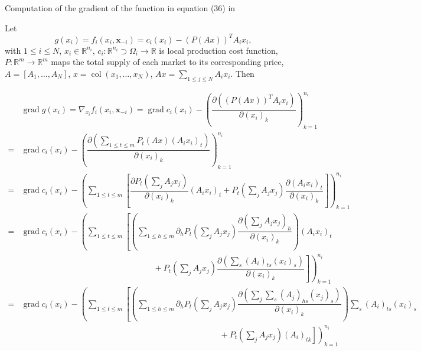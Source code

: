 
Computation of the gradient of the function in equation (36) in \citep{Yi_2019}

Let
$$g(x_i) = f_i(x_i, \mathbf{x}_{-i}) = c_i(x_i) - (P(Ax))^T A_ix_i,$$
with $1 \leqslant i \leqslant N$, $x_i \in \mathbb{R}^{n_i}$, $c_i: \mathbb{R}^{n_i} \supset \Omega_i \to \mathbb{R}$ is local production cost function, $P: \mathbb{R}^m \to \mathbb{R}^m$ maps the total supply of each market to its corresponding price, $A = [A_1, \ldots, A_N]$, $x = \operatorname{col}(x_1, \ldots, x_N)$, $Ax = \sum\limits_{1 \leqslant j \leqslant N} A_ix_i$. Then

\begingroup
\allowdisplaybreaks
\begin{align*}
& \operatorname{grad} g(x_i) = \nabla_{x_i} f_i(x_i, \mathbf{x}_{-i}) = \operatorname{grad} c_i(x_i) - \left( \dfrac{\partial \left( (P(Ax))^T A_ix_i \right)}{\partial (x_i)_k} \right)_{k=1}^{n_i} \\
= & \operatorname{grad} c_i(x_i) - \left( \dfrac{\partial \left( \sum\limits_{1\leqslant t \leqslant m} P_t(Ax) (A_ix_i)_t \right)}{\partial (x_i)_k} \right)_{k=1}^{n_i} \\
= & \operatorname{grad} c_i(x_i) - \left( \sum\limits_{1\leqslant t \leqslant m} \left[ \dfrac{\partial P_t \left( \sum\limits_j A_jx_j \right)}{\partial (x_i)_k} (A_ix_i)_t + P_t \left( \sum\limits_j A_jx_j \right) \dfrac{\partial (A_ix_i)_t}{\partial (x_i)_k} \right] \right)_{k=1}^{n_i} \\
= & \operatorname{grad} c_i(x_i) - \left( \sum\limits_{1\leqslant t \leqslant m} \left[ \left( \sum\limits_{1\leqslant h \leqslant m} \partial_h P_t\left( \sum\limits_j A_jx_j \right) \dfrac{\partial \left( \sum\limits_j A_jx_j \right)_h}{\partial (x_i)_k} \right) (A_ix_i)_t \right.\right. \\
& \left.\left. \hspace{16em} + P_t \left( \sum\limits_j A_jx_j \right) \dfrac{\partial \left( \sum\limits_{s} (A_i)_{ts} (x_i)_s \right)}{\partial (x_i)_k} \right] \right)_{k=1}^{n_i} \\
= & \operatorname{grad} c_i(x_i) - \left( \sum\limits_{1\leqslant t \leqslant m} \left[ \left( \sum\limits_{1\leqslant h \leqslant m} \partial_h P_t\left( \sum\limits_j A_jx_j \right) \dfrac{\partial \left( \sum\limits_j\sum\limits_s (A_j)_{hs} (x_j)_s \right)}{\partial (x_i)_k} \right) \sum\limits_s (A_i)_{ts} (x_i)_s \right.\right. \\
& \left.\left. \hspace{24em} + P_t \left( \sum\limits_j A_jx_j \right) (A_i)_{tk} \right] \right)_{k=1}^{n_i} \\

\end{align*}
